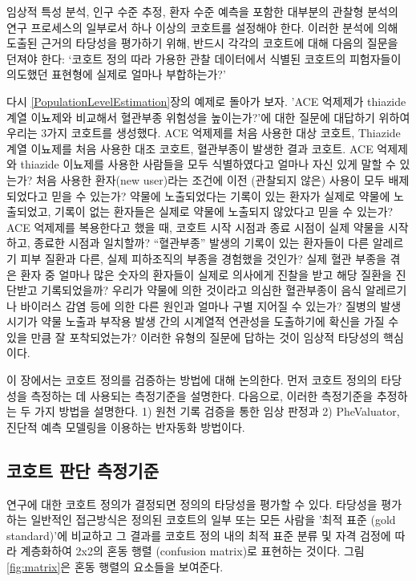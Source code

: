 \documentclass[10.5pt]{book}
\theoremstyle{definition}
\theoremstyle{definition}
\theoremstyle{definition}
\theoremstyle{remark}
\begin{document}
임상적 특성 분석, 인구 수준 추정, 환자 수준 예측을 포함한 대부분의
관찰형 분석의 연구 프로세스의 일부로서 하나 이상의 코호트를 설정해야
한다. 이러한 분석에 의해 도출된 근거의 타당성을 평가하기 위해, 반드시
각각의 코호트에 대해 다음의 질문을 던져야 한다: `코호트 정의 따라 가용한
관찰 데이터에서 식별된 코호트의 피험자들이 의도했던 표현형에 실제로
얼마나 부합하는가?'

다시 \ref{PopulationLevelEstimation}장의 예제로 돌아가 보자. 'ACE
억제제가 thiazide 계열 이뇨제와 비교해서 혈관부종 위험성을 높이는가?'에
대한 질문에 대답하기 위하여 우리는 3가지 코호트를 생성했다. ACE 억제제를
처음 사용한 대상 코호트, Thiazide 계열 이뇨제를 처음 사용한 대조 코호트,
혈관부종이 발생한 결과 코호트. ACE 억제제와 thiazide 이뇨제를 사용한
사람들을 모두 식별하였다고 얼마나 자신 있게 말할 수 있는가? 처음 사용한
환자(new user)라는 조건에 이전 (관찰되지 않은) 사용이 모두 배제되었다고
믿을 수 있는가? 약물에 노출되었다는 기록이 있는 환자가 실제로 약물에
노출되었고, 기록이 없는 환자들은 실제로 약물에 노출되지 않았다고 믿을 수
있는가? ACE 억제제를 복용한다고 했을 때, 코호트 시작 시점과 종료 시점이
실제 약물을 시작하고, 종료한 시점과 일치할까? ``혈관부종'' 발생의 기록이
있는 환자들이 다른 알레르기 피부 질환과 다른, 실제 피하조직의 부종을
경험했을 것인가? 실제 혈관 부종을 겪은 환자 중 얼마나 많은 숫자의
환자들이 실제로 의사에게 진찰을 받고 해당 질환을 진단받고 기록되었을까?
우리가 약물에 의한 것이라고 의심한 혈관부종이 음식 알레르기나 바이러스
감염 등에 의한 다른 원인과 얼마나 구별 지어질 수 있는가? 질병의 발생
시기가 약물 노출과 부작용 발생 간의 시계열적 연관성을 도출하기에 확신을
가질 수 있을 만큼 잘 포착되었는가? 이러한 유형의 질문에 답하는 것이
임상적 타당성의 핵심이다.

이 장에서는 코호트 정의를 검증하는 방법에 대해 논의한다. 먼저 코호트
정의의 타당성을 측정하는 데 사용되는 측정기준을 설명한다. 다음으로,
이러한 측정기준을 추정하는 두 가지 방법을 설명한다. 1) 원천 기록 검증을
통한 임상 판정과 2) PheValuator, 진단적 예측 모델링을 이용하는 반자동화
방법이다.

\subsection{코호트 판단 측정기준}\label{--}

연구에 대한 코호트 정의가 결정되면 정의의 타당성을 평가할 수 있다.
타당성을 평가하는 일반적인 접근방식은 정의된 코호트의 일부 또는 모든
사람을 '최적 표준 (gold standard)'에 비교하고 그 결과를 코호트 정의 내의
최적 표준 분류 및 자격 검정에 따라 계층화하여 2x2의 혼동 행렬 (confusion
matrix)로 표현하는 것이다. 그림 \ref{fig:matrix}은 혼동 행렬의 요소들을
보여준다.
\end{document}
